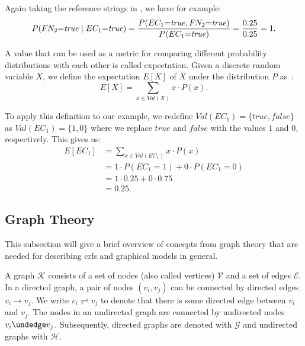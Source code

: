 Again taking the reference strings in , we have for example:
\begin{equation*}
  P(F\hspace{-0.07em} N_2{=}\mathit{true}\mid EC_1{=}\mathit{true})=\frac{P(EC_1{=}\mathit{true}, F\hspace{-0.07em} N_2{=}\mathit{true})}{P(EC_1{=}\mathit{true})}=\frac{0.25}{0.25}=1.
\end{equation*}

\bigskip

A value that can be used as a metric for comparing different \glspl{probability distribution} with each other is called \gls{expectation}.
Given a discrete \gls{random variable} $X$, we define the expectation $E[X]$ of $X$ under the distribution $P$ as~\cite{koller2009probabilistic}:
\begin{equation}
  \label{equ:expectation-x}
  E[X]=\sum_{x\in \mathit{Val}(X)} x\cdot P(x).
\end{equation}

To apply this definition to our example, we redefine $\mathit{Val}(EC_1)=\{\mathit{true},\mathit{false}\}$ as $\mathit{Val}(EC_1)=\{1,0\}$ where we replace $\mathit{true}$ and $\mathit{false}$ with the values $1$ and $0$, respectively.
This gives us:
\begin{equation*}
  \begin{split}
  \label{equ:expectation-x}
  E[EC_1]&=\sum_{x\in \mathit{Val}(EC_1)} x\cdot P(x)\\
  &=1\cdot P(EC_1{=}1)+0\cdot P(EC_1{=}0)\\
  &=1\cdot 0.25+0\cdot 0.75\\
  &=0.25.
  \end{split}
\end{equation*}

\subsection{Graph Theory}\label{subsec:graph-theory}

This subsection will give a brief overview of concepts from graph theory that are needed for describing \glspl{crf} and graphical models in general.

\bigskip

A \gls{graph} $\mathcal{K}$ consists of a set of \glspl{node} (also called vertices) $\mathcal{V}$ and a set of \glspl{edge} $\mathcal{E}$.
In a directed \gls{graph}, a pair of \glspl{node} $(v_i,v_j)$ can be connected by directed \glspl{edge} $v_i\to v_j$.
We write $v_i\rightleftharpoons v_j$ to denote that there is some directed edge between $v_i$ and $v_j$.
The \glspl{node} in an undirected graph are connected by undirected \glspl{node} $v_i\undedge v_j$.
Subsequently, directed \glspl{graph} are denoted with $\mathcal{G}$ and undirected \glspl{graph} with $\mathcal{H}$.

